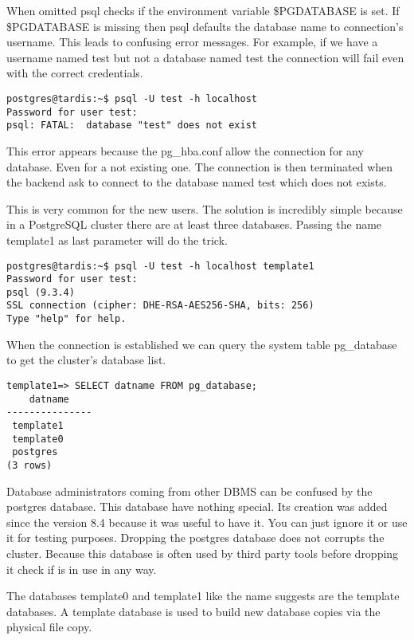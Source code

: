When omitted psql checks if the environment variable \$PGDATABASE  is 
set. If \$PGDATABASE is missing then psql defaults the database name to connection's username. This 
leads to confusing error messages. For example, if we have a username named test but not a database 
named test the connection will fail even with the correct credentials.

\begin{verbatim}
postgres@tardis:~$ psql -U test -h localhost
Password for user test: 
psql: FATAL:  database "test" does not exist
\end{verbatim}

This error appears because the pg\_hba.conf allow the connection for any database. Even for a not
existing one. The connection is then terminated when the backend ask to connect to the database 
named test which does not exists.\newline

This is very common for the new users. The solution is incredibly simple because in a PostgreSQL 
cluster there are at least three databases. Passing the name template1 as last parameter will do 
the trick.

\begin{verbatim}
postgres@tardis:~$ psql -U test -h localhost template1
Password for user test: 
psql (9.3.4)
SSL connection (cipher: DHE-RSA-AES256-SHA, bits: 256)
Type "help" for help.
\end{verbatim}

When the connection is established we can query the system table pg\_database to get the 
cluster's database list. 

\begin{lstlisting}[style=pgsql]
template1=> SELECT datname FROM pg_database;
    datname    
---------------
 template1
 template0
 postgres
(3 rows)

\end{lstlisting}

Database administrators coming from other DBMS can be confused by the postgres database.
This database have nothing special. Its creation was added since the version 8.4 because it was 
useful to have it. You can just ignore it or use it for testing purposes. Dropping the postgres 
database does not corrupts the cluster. Because this database is often used by third party 
tools before dropping it check if is in use in any way.\newline

The databases template0 and template1   like the name suggests are the template databases. A template database  is used to build new database copies via the physical file copy. 

